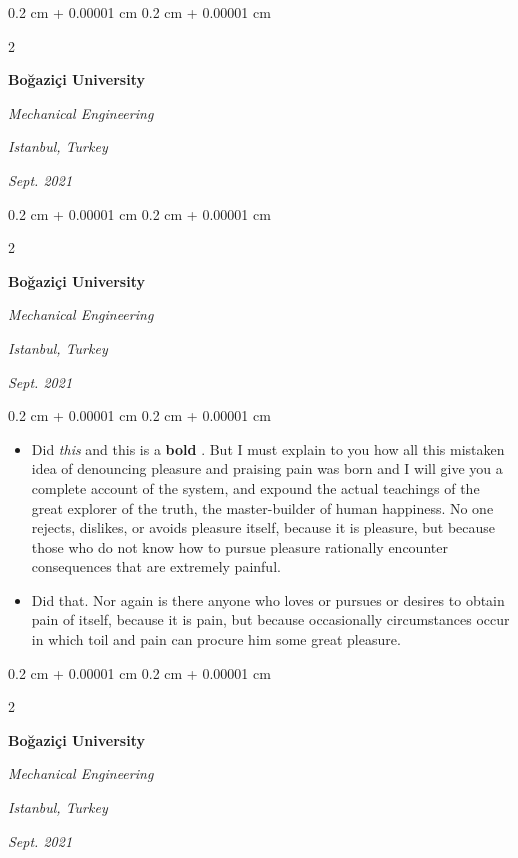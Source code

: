 \documentclass[10pt, letterpaper]{article}
\newenvironment{highlights}{
    \begin{itemize}[
        topsep=0.10 cm,
        parsep=0.10 cm,
        partopsep=0pt,
        itemsep=0pt,
        leftmargin=0.4 cm + 10pt
    ]
}{
    \end{itemize}
} %
\newenvironment{onecolentry}{
    \begin{adjustwidth}{
        0.2 cm + 0.00001 cm
    }{
        0.2 cm + 0.00001 cm
    }
}{
    \end{adjustwidth}
} %
\newenvironment{twocolentry}[2][]{
    \onecolentry
    \def\secondColumn{#2}
    \setcolumnwidth{\fill, 4.5 cm}
    \begin{paracol}{2}
}{
    \switchcolumn \raggedleft \secondColumn
    \end{paracol}
    \endonecolentry
} %
\let\hrefWithoutArrow\href
\renewcommand{\href}[2]{\hrefWithoutArrow{#1}{\mbox{\ifthenelse{\equal{#2}{}}{ }{#2 }\raisebox{.15ex}{\footnotesize \faExternalLink*}}}}
\begin{document}
        \vspace{0.2 cm-3px}

        \begin{twocolentry}{
        \textit{Istanbul, Turkey}    
            
        \textit{Sept. 2021}}
            \textbf{Boğaziçi University}

            \textit{Mechanical Engineering}
        \end{twocolentry}



        \vspace{0.2 cm-3px}

        \begin{twocolentry}{
        \textit{Istanbul, Turkey}    
            
        \textit{Sept. 2021}}
            \textbf{Boğaziçi University}

            \textit{Mechanical Engineering}
        \end{twocolentry}

        \vspace{0.10 cm-3px}
        \begin{onecolentry}
            \begin{highlights}
                \item Did \textit{this} and this is a \textbf{bold} \href{https://example.com}{link}. But I must explain to you how all this mistaken idea of denouncing pleasure and praising pain was born and I will give you a complete account of the system, and expound the actual teachings of the great explorer of the truth, the master-builder of human happiness. No one rejects, dislikes, or avoids pleasure itself, because it is pleasure, but because those who do not know how to pursue pleasure rationally encounter consequences that are extremely painful.
                \item Did that. Nor again is there anyone who loves or pursues or desires to obtain pain of itself, because it is pain, but because occasionally circumstances occur in which toil and pain can procure him some great pleasure.
            \end{highlights}
        \end{onecolentry}


        \vspace{0.2 cm-3px}

        \begin{twocolentry}{
        \textit{Istanbul, Turkey}    
            
        \textit{Sept. 2021}}
            \textbf{Boğaziçi University}

            \textit{Mechanical Engineering}
        \end{twocolentry}
\end{document}
